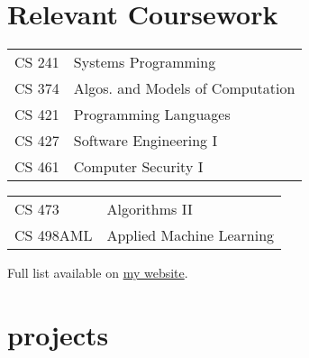 \documentclass{tccv}
\begin{document}
\section{Relevant Coursework}
\begin{courselist}

  \begin{tabular}{l l}
    CS 241 & Systems Programming \\
    CS 374 & Algos. and Models of Computation \\
    CS 421 & Programming Languages \\
    CS 427 & Software Engineering I \\
    CS 461 & Computer Security I \\
  \end{tabular}

  \begin{tabular}{l l}
    CS 473 & Algorithms II \\
    CS 498AML & Applied Machine Learning \\
  \end{tabular}
  \forceskip
  Full list available on \href{https://shotaroikeda.github.io/}{my website}.

\end{courselist}

\section{projects}
\end{document}
